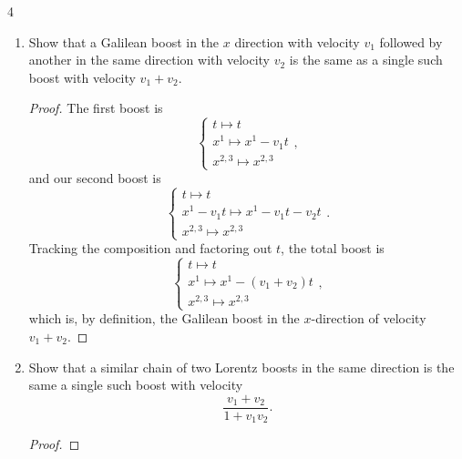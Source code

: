 \documentclass[11pt]{article}
\begin{document}
\begin{problem}{4}\hfill
	\begin{enumerate}[label=(\alph*)]
		\item Show that a Galilean boost in the \( x \) direction with velocity \( v_1 \) followed by another in the same direction with velocity \( v_2 \) is the same as a single such boost with velocity \( v_1 + v_2 \).
          \begin{proof}
            The first boost is
            \begin{equation}
            \label{eq:63}
            \begin{cases}
              t \mapsto t \\
              x^1 \mapsto x^1 - v_1t \\
              x^{2,3} \mapsto x^{2,3}
            \end{cases},
          \end{equation}
          and our second boost is
          \begin{equation}
          \label{eq:22}
            \begin{cases}
              t \mapsto t \\
              x^{1} - v_1t \mapsto x^{1} - v_1t - v_2t \\
              x^{2,3} \mapsto x^{2,3}
            \end{cases}.
          \end{equation}
          Tracking the composition and factoring out \( t \), the total boost is
          \begin{equation}
          \label{eq:23}
          \begin{cases}
            t \mapsto t \\
            x^{1} \mapsto x^{1} - (v_1 + v_2)t \\
            x^{2,3} \mapsto x^{2,3}
          \end{cases},
        \end{equation}
        which is, by definition, the Galilean boost in the \( x \)-direction of velocity \( v_1 + v_2 \).
          \end{proof}
		\item Show that a similar chain of two Lorentz boosts in the same direction is the same a single such boost with velocity
		      \begin{equation}
			      \label{eq:15}
			      \frac{v_{1} + v_2}{1 + v_1v_2}.
		      \end{equation}
          \begin{proof}

\end{proof}
\end{enumerate}
\end{problem}
\end{document}
